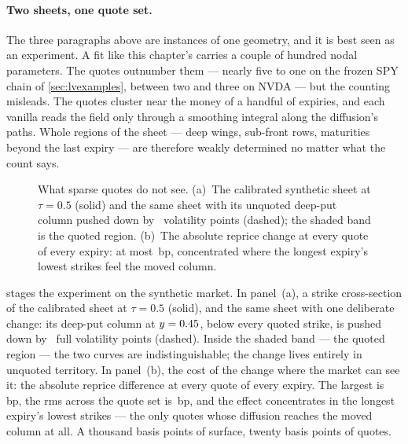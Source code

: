 \paragraph{Two sheets, one quote set.}
The three paragraphs above are instances of one geometry, and it is
best seen as an experiment.  A fit like this chapter's carries a
couple of hundred nodal parameters.  The quotes outnumber them ---
nearly five to one on the frozen SPY chain of \cref{sec:lvexamples},
between two and three on NVDA --- but the counting misleads.  The
quotes cluster near the money of a handful of expiries, and each
vanilla reads the field only through a smoothing integral along the
diffusion's paths.  Whole regions of the sheet --- deep wings,
sub-front rows, maturities beyond the last expiry --- are therefore
weakly determined no matter what the count says.

\begin{figure}[htbp]
\centering
{}
\caption{What sparse quotes do not see.  (a)~The calibrated synthetic
sheet at $\tau=0.5$ (solid) and the same sheet with its unquoted
deep-put column pushed down by \MacLvIdentMovePts\ volatility points
(dashed); the shaded band is the quoted region.  (b)~The absolute
reprice change at every quote of every expiry: at most
\MacLvIdentMaxDiffBp\,bp, concentrated where the longest expiry's
lowest strikes feel the moved column.}
\label{fig:lvidentify}
\end{figure}

 stages the experiment on the synthetic market.
In panel~(a), a strike cross-section of the calibrated sheet at
$\tau=0.5$ (solid), and the same sheet with one deliberate change: its
deep-put column at $y=0.45$, below every quoted strike, is
pushed down by \MacLvIdentMovePts\ full volatility points (dashed).
Inside the shaded band --- the quoted region --- the two curves are
indistinguishable; the change lives entirely in unquoted territory.
In panel~(b), the cost of the change where the market can see it: the
absolute reprice difference at every quote of every expiry.  The
largest is \MacLvIdentMaxDiffBp\,bp, the rms across the quote set is
\MacLvIdentRmsDiffBp\,bp, and the effect concentrates in the longest
expiry's lowest strikes --- the only quotes whose diffusion reaches
the moved column at all.  A thousand basis points of surface, twenty
basis points of quotes.

